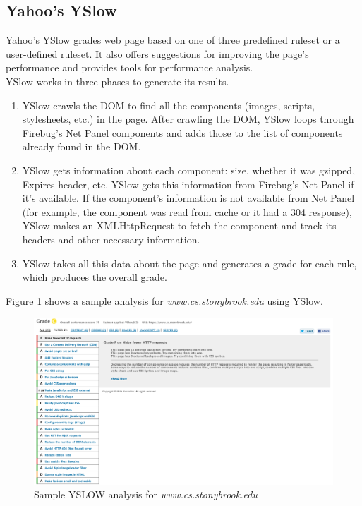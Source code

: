 \subsection{Yahoo's YSlow}
Yahoo's YSlow \cite{yslow}  grades web page based on one of three predefined ruleset or a user-defined ruleset.
It also offers suggestions for improving the page's performance and provides tools for performance analysis.\\

\noindent YSlow works in three phases to generate its results.

\begin{enumerate}

\item YSlow crawls the DOM to find all the components (images, scripts, stylesheets, etc.) in the page. After crawling the DOM, YSlow loops through Firebug's \cite{firebug} Net Panel components and adds those to the list of components already found in the DOM.
\item YSlow gets information about each component: size, whether it was gzipped, Expires header, etc. YSlow gets this information from Firebug's Net Panel if it's available. If the component's information is not available from Net Panel (for example, the component was read from cache or it had a 304 response), YSlow makes an XMLHttpRequest to fetch the component and track its headers and other necessary information.
\item YSlow takes all this data about the page and generates a grade for each rule, which produces the overall grade.
\end{enumerate}

\noindent Figure \ref{fig:yslow_stonybrook} shows a sample analysis for {\em www.cs.stonybrook.edu} using YSlow.
\begin{figure}[!htb]
  \centering
    \includegraphics[width=0.85 \textwidth]{./figures/optimization/yslow_stonybrook.pdf}
  \caption {Sample YSLOW analysis for {\em www.cs.stonybrook.edu}}
  \label{fig:yslow_stonybrook}
\end{figure}


